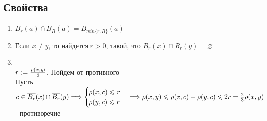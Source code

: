 \documentclass[12pt,letterpaper]{report}
\makeatletter
\theoremstyle{definition}
\renewenvironment{proof}[1][\proofname]{%
   \par\pushQED{\qed}\normalfont%
   \topsep6\p@\@plus6\p@\relax
   \trivlist\item[\hskip\labelsep\bfseries#1\@addpunct{.}]%
   \ignorespaces
}{%
   \popQED\endtrivlist\@endpefalse
}
\makeatother
\begin{document}
    \subsection*{Свойства}
    \begin{enumerate}
        \item $B_r(a) \cap B_R(a) = B_{min\{r, R\}}(a)$
        \item Если $x \neq y$, то найдется $r > 0$, такой, что 
        $\overline{B_r}(x) \cap \overline{B_r}(y) = \varnothing$
        \begin{proof}
            \quad \\
            $r := {{\rho(x, y)}\over{3}}$. Пойдем от противного \\
            Пусть $c \in \overline{B_r}(x) \cap \overline{B_r}(y) \Longrightarrow
            \begin{cases}
                \rho(x, c) \leqslant r \\
                \rho(y, c) \leqslant r
            \end{cases} \Longrightarrow \rho(x, y) \leqslant \rho(x, c) + \rho(y, c) 
            \leqslant 2r = {{2}\over{3}}\rho(x, y)$ - противоречие
        \end{proof}
    \end{enumerate}
\end{document}

